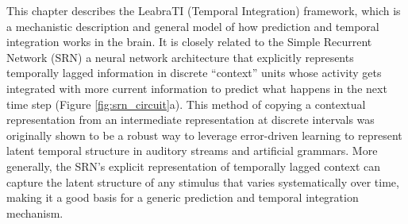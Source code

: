 \documentclass[dwyatte_dissertation.tex]{subfiles}
\begin{document}




This chapter describes the LeabraTI (Temporal Integration) framework, which is a mechanistic description and general model of how prediction and temporal integration works in the brain. It is closely related to the Simple Recurrent Network (SRN) \cite{Elman90,Servan-SchreiberCleeremansMcClelland91}  a neural network architecture that explicitly represents temporally lagged information in discrete ``context'' units whose activity gets integrated with more current information to predict what happens in the next time step (Figure \ref{fig:srn_circuit}a). This method of copying a contextual representation from an intermediate representation at discrete intervals was originally shown to be a robust way to leverage error-driven learning to represent latent temporal structure in auditory streams and artificial grammars. More generally, the SRN's explicit representation of temporally lagged context can capture the latent structure of any stimulus that varies systematically over time, making it a good basis for a generic prediction and temporal integration mechanism.
\end{document}
